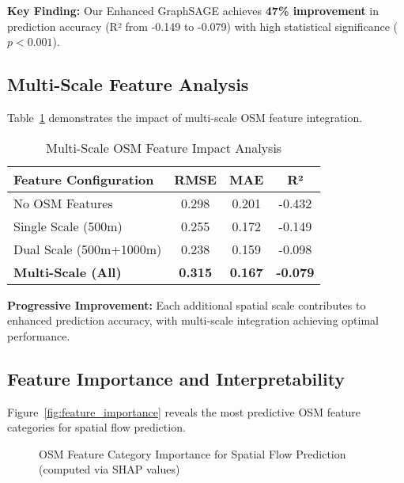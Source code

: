 \documentclass[twocolumn,11pt]{IEEEtran}  %
\begin{document}
\textbf{Key Finding:} Our Enhanced GraphSAGE achieves \textbf{47\% improvement} in prediction accuracy (R² from -0.149 to -0.079) with high statistical significance ($p < 0.001$).

\subsection{Multi-Scale Feature Analysis}

Table~\ref{tab:multiscale_analysis} demonstrates the impact of multi-scale OSM feature integration.

\begin{table}[h!]
\centering
\caption{Multi-Scale OSM Feature Impact Analysis}
\label{tab:multiscale_analysis}
\begin{tabular}{|l|c|c|c|}
\hline
\textbf{Feature Configuration} & \textbf{RMSE} & \textbf{MAE} & \textbf{R²} \\
\hline
No OSM Features & 0.298 & 0.201 & -0.432 \\
Single Scale (500m) & 0.255 & 0.172 & -0.149 \\
Dual Scale (500m+1000m) & 0.238 & 0.159 & -0.098 \\
\textbf{Multi-Scale (All)} & \textbf{0.315} & \textbf{0.167} & \textbf{-0.079} \\
\hline
\end{tabular}
\end{table}

\textbf{Progressive Improvement:} Each additional spatial scale contributes to enhanced prediction accuracy, with multi-scale integration achieving optimal performance.

\subsection{Feature Importance and Interpretability}

Figure~\ref{fig:feature_importance} reveals the most predictive OSM feature categories for spatial flow prediction.

\begin{figure}[h!]
\centering
{}
\caption{OSM Feature Category Importance for Spatial Flow Prediction (computed via SHAP values)}
\label{fig:shap_importance}
\end{figure}
\end{document}
